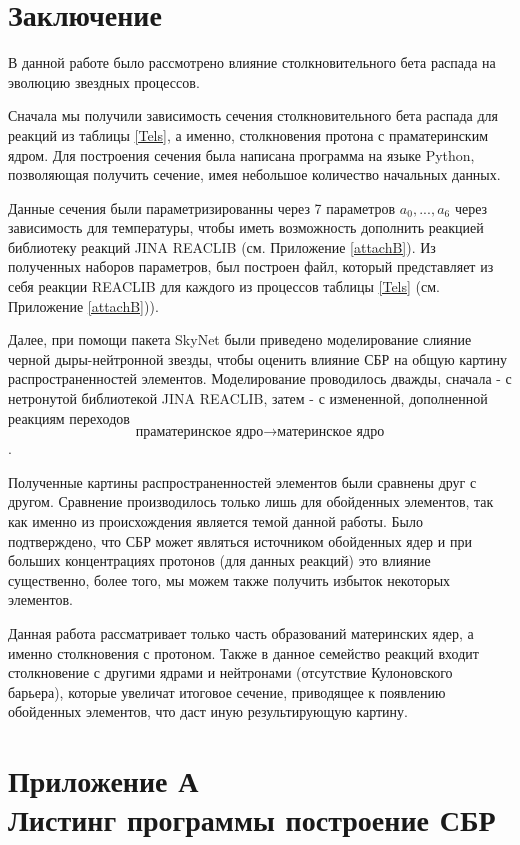 \documentclass[14pt, a4paper]{article}
\numberwithin{figure}{section}
\numberwithin{equation}{section}
\begin{document}
\section{Заключение}

В данной работе было рассмотрено влияние столкновительного бета распада на эволюцию звездных процессов. 

Сначала мы получили зависимость сечения столкновительного бета распада для реакций из таблицы \ref{Tels}, а именно, столкновения протона с праматеринским ядром. Для построения сечения была написана программа на языке Python, позволяющая получить сечение, имея небольшое количество начальных данных.

Данные сечения были параметризированны через 7 параметров $a_0, ..., a_6$ через зависимость для температуры, чтобы иметь возможность дополнить реакцией библиотеку реакций JINA REACLIB (см. Приложение \ref{attachB}). Из полученных наборов параметров, был построен файл, который представляет из себя реакции REACLIB для каждого из процессов таблицы \ref{Tels} (см. Приложение \ref{attachB})).  

Далее, при помощи пакета SkyNet были приведено моделирование слияние черной дыры-нейтронной звезды, чтобы оценить влияние СБР на общую картину распространенностей элементов. Моделирование проводилось дважды, сначала - с нетронутой библиотекой JINA REACLIB, затем - с измененной, дополненной реакциям переходов $$\text{праматеринское ядро} \to \text{материнское ядро}$$. 

Полученные картины распространенностей элементов были сравнены друг с другом. Сравнение производилось только лишь для обойденных элементов, так как именно из происхождения является темой данной работы. Было подтверждено, что СБР может являться источником обойденных ядер и при больших концентрациях протонов (для данных реакций) это влияние существенно, более того, мы можем также получить избыток некоторых элементов. 

Данная работа рассматривает только часть образований материнских ядер, а именно столкновения с протоном. Также в данное семейство реакций входит столкновение с другими ядрами и нейтронами (отсутствие Кулоновского барьера), которые увеличат итоговое сечение, приводящее к появлению обойденных элементов, что даст иную результирующую картину.




\newpage
{}
\section*{Приложение А\\Листинг программы построение СБР}\label{attachA}
\end{document}
